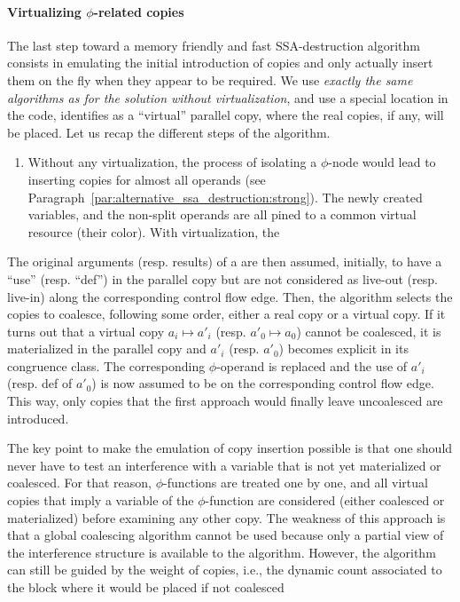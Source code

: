 \paragraph{Virtualizing $\phi$-related copies}
The last step toward a memory friendly and fast SSA-destruction algorithm consists in emulating the initial introduction of copies and only actually insert them on the fly when they appear to be required. We use \emph{exactly the same algorithms as for the solution without virtualization}, and use a special location in the code, identifies as a ``virtual'' parallel copy, where the real copies, if any, will be placed. Let us recap the different steps of the algorithm.
\begin{enumerate}
\item Without any virtualization, the process of isolating a $\phi$-node would lead to inserting copies for almost all operands (see Paragraph~\ref{par:alternative_ssa_destruction:strong}). The newly created variables, and the non-split operands are all pined to a common virtual resource (their color). With virtualization, the \phifun 
\end{enumerate}
The original arguments (resp. results) of a \phifun are then assumed, initially, to have a ``use'' (resp. ``def'') in the parallel copy
but are not considered as live-out (resp. live-in) along the corresponding
control flow edge. Then, the algorithm selects the copies to coalesce, following
some order, either a real copy or a virtual copy.  If it turns out that a
virtual copy $a_i \mapsto a'_i$ (resp. $a'_0 \mapsto a_0$) cannot be coalesced,
it is materialized in the parallel copy and $a'_i$ (resp. $a'_0$) becomes
explicit in its congruence class. The corresponding $\phi$-operand is replaced
and the use of $a'_i$ (resp. def of $a'_0$) is now assumed to be on the
corresponding control flow edge.
This way, only copies that the first approach would finally leave uncoalesced
are introduced. 

The key point to make the emulation of copy insertion possible is that one
should never have to test an interference with a variable that is not yet
materialized or coalesced. For that reason, $\phi$-functions are treated one by one, and
all virtual copies that imply a variable of the $\phi$-function are considered
(either coalesced or materialized) before examining any other copy. The
weakness of this approach is that a global coalescing algorithm cannot be used
because only a partial view of the interference structure is available
to the algorithm. However, the algorithm can still be guided by the weight
of copies, i.e., the dynamic count associated to the block where it would be
placed if not coalesced

